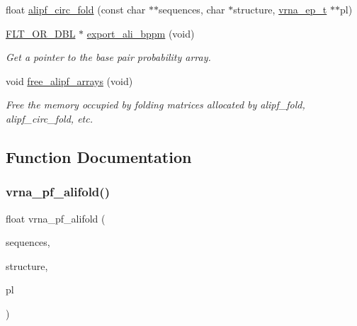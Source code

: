 \begin{DoxyCompactItemize}
float \mbox{\hyperlink{group__consensus__pf__fold_ga604a42ad64178279551ad3e4def3d603}{alipf\+\_\+circ\+\_\+fold}} (const char $\ast$$\ast$sequences, char $\ast$structure, \mbox{\hyperlink{group__struct__utils_gab9ac98ab55ded9fb90043b024b915aca}{vrna\+\_\+ep\+\_\+t}} $\ast$$\ast$pl)
\item 
\mbox{\hyperlink{group__data__structures_ga31125aeace516926bf7f251f759b6126}{F\+L\+T\+\_\+\+O\+R\+\_\+\+D\+BL}} $\ast$ \mbox{\hyperlink{group__consensus__pf__fold_ga11b6ab8bd9be1821fea352b190a01cab}{export\+\_\+ali\+\_\+bppm}} (void)
\begin{DoxyCompactList}\small\item\em Get a pointer to the base pair probability array. \end{DoxyCompactList}\item 
void \mbox{\hyperlink{group__consensus__pf__fold_ga0c0498f35686e26b38ee460d3db1a661}{free\+\_\+alipf\+\_\+arrays}} (void)
\begin{DoxyCompactList}\small\item\em Free the memory occupied by folding matrices allocated by alipf\+\_\+fold, alipf\+\_\+circ\+\_\+fold, etc. \end{DoxyCompactList}\end{DoxyCompactItemize}


\subsection{Function Documentation}
\mbox{\label{group__consensus__pf__fold_ga374e31a0f326b2c5da5b84e143a63f38}} 
\subsubsection{\texorpdfstring{vrna\+\_\+pf\+\_\+alifold()}{vrna\_pf\_alifold()}}
{\footnotesize\ttfamily float vrna\+\_\+pf\+\_\+alifold (\begin{DoxyParamCaption}\item[{const char $\ast$$\ast$}]{sequences,  }\item[{char $\ast$}]{structure,  }\item[{\mbox{\hyperlink{group__struct__utils_gab9ac98ab55ded9fb90043b024b915aca}{vrna\+\_\+ep\+\_\+t}} $\ast$$\ast$}]{pl }\end{DoxyParamCaption})}



